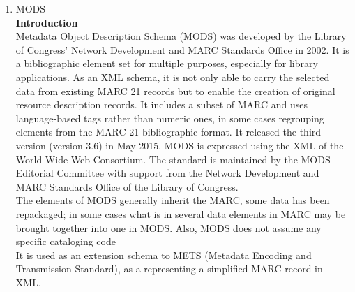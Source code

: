 \begin{enumerate}
	\item MODS\\
	{\bf Introduction}\\
	Metadata Object Description Schema (MODS) was developed by the Library of Congress' Network Development and MARC Standards Office in 2002. It is a bibliographic element set for multiple purposes, especially for library applications. As an XML schema, it is not only able to carry the selected data from existing MARC 21 records but to enable the creation of original resource description records. It includes a subset of MARC and uses language-based tags rather than numeric ones, in some cases regrouping elements from the MARC 21 bibliographic format. It released the third version (version 3.6) in May 2015. MODS is expressed using the XML of the World Wide Web Consortium. The standard is maintained by the MODS Editorial Committee with support from the Network Development and MARC Standards Office of the Library of Congress.\\
	
	The elements of MODS generally inherit the MARC, some data has been repackaged; in some cases what is in several data elements in MARC may be brought together into one in MODS. Also, MODS does not assume any specific cataloging code\\ It is used as an extension schema to METS (Metadata Encoding and Transmission Standard), as a representing a simplified MARC record in XML.
	

\end{enumerate}
